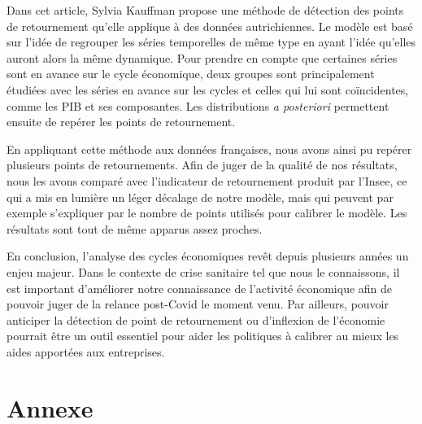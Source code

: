 \documentclass[10pt,french,french]{article}
\begin{document}
Dans cet article, Sylvia Kauffman propose une méthode de détection des points de retournement qu'elle applique à des données autrichiennes. Le modèle est basé sur l'idée de regrouper les séries temporelles de même type en ayant l'idée qu'elles auront alors la même dynamique. Pour prendre en compte que certaines séries sont en avance sur le cycle économique, deux groupes sont principalement étudiées avec les séries en avance sur les cycles et celles qui lui sont coïncidentes, comme les PIB et ses composantes. Les distributions \emph{a posteriori} permettent ensuite de repérer les points de retournement.

En appliquant cette méthode aux données françaises, nous avons ainsi pu repérer plusieurs points de retournements. Afin de juger de la qualité de nos résultats, nous les avons comparé avec l'indicateur de retournement produit par l'Insee, ce qui a mis en lumière un léger décalage de notre modèle, mais qui peuvent par exemple s'expliquer par le nombre de points utilisés pour calibrer le modèle. Les résultats sont tout de même apparus assez proches.

En conclusion, l'analyse des cycles économiques revêt depuis plusieurs années un enjeu majeur. Dans le contexte de crise sanitaire tel que nous le connaissons, il est important d'améliorer notre connaissance de l'activité économique afin de pouvoir juger de la relance post-Covid le moment venu. Par ailleurs, pouvoir anticiper la détection de point de retournement ou d'inflexion de l'économie pourrait être un outil essentiel pour aider les politiques à calibrer au mieux les aides apportées aux entreprises.

\newpage
\appendix

\hypertarget{annexe}{%
\section{Annexe}\label{annexe}}
\end{document}
